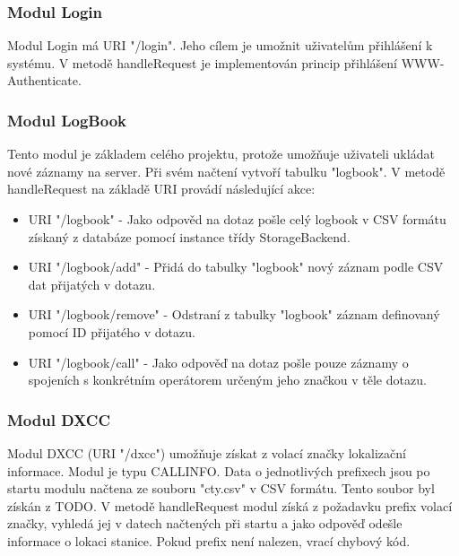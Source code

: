 \subsubsection{Modul Login}

Modul Login má URI "/login". Jeho cílem je umožnit uživatelům přihlášení k systému. V metodě handleRequest je
implementován princip přihlášení WWW-Authenticate. %

\subsubsection{Modul LogBook}

Tento modul je základem celého projektu, protože umožňuje uživateli ukládat nové záznamy na server. Při svém načtení
vytvoří tabulku "logbook". V metodě handleRequest na základě URI provádí následující akce:

\begin{itemize}
\item URI "/logbook" - Jako odpověd na dotaz pošle celý logbook %
v CSV formátu získaný z databáze pomocí instance třídy StorageBackend.
\item URI "/logbook/add" - Přidá do tabulky "logbook" nový záznam podle CSV dat přijatých v dotazu.
\item URI "/logbook/remove" - Odstraní z tabulky "logbook" záznam definovaný pomocí ID přijatého v dotazu.
\item URI "/logbook/call" - Jako odpověď na dotaz pošle pouze záznamy o spojeních s konkrétním operátorem určeným jeho značkou v 
těle dotazu.
\end{itemize}

\subsubsection{Modul DXCC}

Modul DXCC (URI "/dxcc") umožňuje získat z volací značky lokalizační informace. Modul je typu CALLINFO.
Data o jednotlivých prefixech
jsou po startu modulu načtena ze souboru "cty.csv" v CSV formátu. Tento soubor
byl získán z TODO. %
V metodě handleRequest modul získá z požadavku prefix volací
značky, vyhledá jej v datech načtených při startu %
a jako odpověď odešle informace o lokaci stanice. Pokud prefix není nalezen,
vrací chybový kód.

